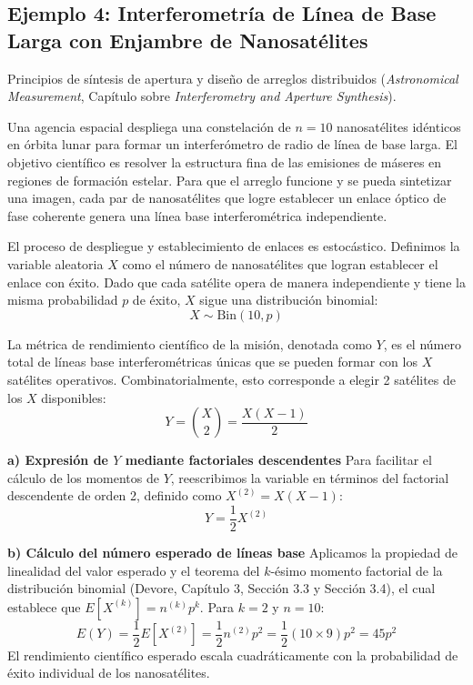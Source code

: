 \subsection{Ejemplo 4: Interferometría de Línea de Base Larga con Enjambre de Nanosatélites}

Principios de síntesis de apertura y diseño de arreglos distribuidos (\textit{Astronomical Measurement}, Capítulo sobre \textit{Interferometry and Aperture Synthesis}).

Una agencia espacial despliega una constelación de $n = 10$ nanosatélites idénticos en órbita lunar para formar un interferómetro de radio de línea de base larga. El objetivo científico es resolver la estructura fina de las emisiones de máseres en regiones de formación estelar. Para que el arreglo funcione y se pueda sintetizar una imagen, cada par de nanosatélites que logre establecer un enlace óptico de fase coherente genera una línea base interferométrica independiente. 

El proceso de despliegue y establecimiento de enlaces es estocástico. Definimos la variable aleatoria $X$ como el número de nanosatélites que logran establecer el enlace con éxito. Dado que cada satélite opera de manera independiente y tiene la misma probabilidad $p$ de éxito, $X$ sigue una distribución binomial:
$$ X \sim \text{Bin}(10, p) $$

La métrica de rendimiento científico de la misión, denotada como $Y$, es el número total de líneas base interferométricas únicas que se pueden formar con los $X$ satélites operativos. Combinatorialmente, esto corresponde a elegir 2 satélites de los $X$ disponibles:
$$ Y = \binom{X}{2} = \frac{X(X-1)}{2} $$


\textbf{a) Expresión de $Y$ mediante factoriales descendentes}
Para facilitar el cálculo de los momentos de $Y$, reescribimos la variable en términos del factorial descendente de orden 2, definido como $X^{(2)} = X(X-1)$:
$$ Y = \frac{1}{2} X^{(2)} $$

\textbf{b) Cálculo del número esperado de líneas base}
Aplicamos la propiedad de linealidad del valor esperado y el teorema del $k$-ésimo momento factorial de la distribución binomial (Devore, Capítulo 3, Sección 3.3 y Sección 3.4), el cual establece que $E[X^{(k)}] = n^{(k)} p^k$. Para $k=2$ y $n=10$:
$$ E(Y) = \frac{1}{2} E[X^{(2)}] = \frac{1}{2} n^{(2)} p^2 = \frac{1}{2} (10 \times 9) p^2 = 45 p^2 $$
El rendimiento científico esperado escala cuadráticamente con la probabilidad de éxito individual de los nanosatélites.

